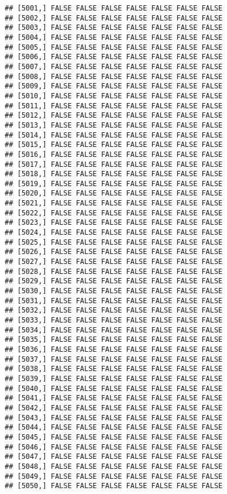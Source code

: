 \documentclass[
]{article}
\begin{document}
\begin{verbatim}
## [5001,] FALSE FALSE FALSE FALSE FALSE FALSE FALSE
## [5002,] FALSE FALSE FALSE FALSE FALSE FALSE FALSE
## [5003,] FALSE FALSE FALSE FALSE FALSE FALSE FALSE
## [5004,] FALSE FALSE FALSE FALSE FALSE FALSE FALSE
## [5005,] FALSE FALSE FALSE FALSE FALSE FALSE FALSE
## [5006,] FALSE FALSE FALSE FALSE FALSE FALSE FALSE
## [5007,] FALSE FALSE FALSE FALSE FALSE FALSE FALSE
## [5008,] FALSE FALSE FALSE FALSE FALSE FALSE FALSE
## [5009,] FALSE FALSE FALSE FALSE FALSE FALSE FALSE
## [5010,] FALSE FALSE FALSE FALSE FALSE FALSE FALSE
## [5011,] FALSE FALSE FALSE FALSE FALSE FALSE FALSE
## [5012,] FALSE FALSE FALSE FALSE FALSE FALSE FALSE
## [5013,] FALSE FALSE FALSE FALSE FALSE FALSE FALSE
## [5014,] FALSE FALSE FALSE FALSE FALSE FALSE FALSE
## [5015,] FALSE FALSE FALSE FALSE FALSE FALSE FALSE
## [5016,] FALSE FALSE FALSE FALSE FALSE FALSE FALSE
## [5017,] FALSE FALSE FALSE FALSE FALSE FALSE FALSE
## [5018,] FALSE FALSE FALSE FALSE FALSE FALSE FALSE
## [5019,] FALSE FALSE FALSE FALSE FALSE FALSE FALSE
## [5020,] FALSE FALSE FALSE FALSE FALSE FALSE FALSE
## [5021,] FALSE FALSE FALSE FALSE FALSE FALSE FALSE
## [5022,] FALSE FALSE FALSE FALSE FALSE FALSE FALSE
## [5023,] FALSE FALSE FALSE FALSE FALSE FALSE FALSE
## [5024,] FALSE FALSE FALSE FALSE FALSE FALSE FALSE
## [5025,] FALSE FALSE FALSE FALSE FALSE FALSE FALSE
## [5026,] FALSE FALSE FALSE FALSE FALSE FALSE FALSE
## [5027,] FALSE FALSE FALSE FALSE FALSE FALSE FALSE
## [5028,] FALSE FALSE FALSE FALSE FALSE FALSE FALSE
## [5029,] FALSE FALSE FALSE FALSE FALSE FALSE FALSE
## [5030,] FALSE FALSE FALSE FALSE FALSE FALSE FALSE
## [5031,] FALSE FALSE FALSE FALSE FALSE FALSE FALSE
## [5032,] FALSE FALSE FALSE FALSE FALSE FALSE FALSE
## [5033,] FALSE FALSE FALSE FALSE FALSE FALSE FALSE
## [5034,] FALSE FALSE FALSE FALSE FALSE FALSE FALSE
## [5035,] FALSE FALSE FALSE FALSE FALSE FALSE FALSE
## [5036,] FALSE FALSE FALSE FALSE FALSE FALSE FALSE
## [5037,] FALSE FALSE FALSE FALSE FALSE FALSE FALSE
## [5038,] FALSE FALSE FALSE FALSE FALSE FALSE FALSE
## [5039,] FALSE FALSE FALSE FALSE FALSE FALSE FALSE
## [5040,] FALSE FALSE FALSE FALSE FALSE FALSE FALSE
## [5041,] FALSE FALSE FALSE FALSE FALSE FALSE FALSE
## [5042,] FALSE FALSE FALSE FALSE FALSE FALSE FALSE
## [5043,] FALSE FALSE FALSE FALSE FALSE FALSE FALSE
## [5044,] FALSE FALSE FALSE FALSE FALSE FALSE FALSE
## [5045,] FALSE FALSE FALSE FALSE FALSE FALSE FALSE
## [5046,] FALSE FALSE FALSE FALSE FALSE FALSE FALSE
## [5047,] FALSE FALSE FALSE FALSE FALSE FALSE FALSE
## [5048,] FALSE FALSE FALSE FALSE FALSE FALSE FALSE
## [5049,] FALSE FALSE FALSE FALSE FALSE FALSE FALSE
## [5050,] FALSE FALSE FALSE FALSE FALSE FALSE FALSE

\end{verbatim}
\end{document}
